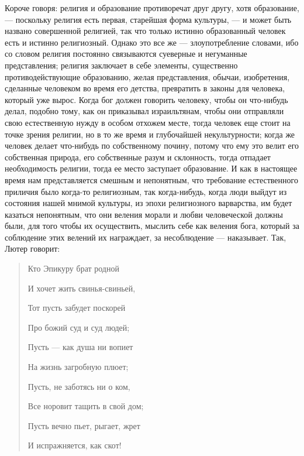 \documentclass[12pt]{article}
\begin{document}
Короче говоря: религия и образование противоречат друг другу, хотя образование, --- поскольку религия есть первая, старейшая форма культуры, --- и может быть названо совершенной религией, так что только истинно образованный человек есть и истинно религиозный. Однако это все же --- злоупотребление словами, ибо со словом религия постоянно связываются суеверные и негуманные представления; религия заключает в себе элементы, существенно противодействующие образованию, желая представления, обычаи, изобретения, сделанные человеком во время его детства, превратить в законы для человека, который уже вырос. Когда бог должен говорить человеку, чтобы он что-нибудь делал, подобно тому, как он приказывал израильтянам, чтобы они отправляли свою естественную нужду в особом отхожем месте, тогда человек еще стоит на точке зрения религии, но в то же время и глубочайшей некультурности; когда же человек делает что-нибудь по собственному почину, потому что ему это велит его собственная природа, его собственные разум и склонность, тогда отпадает необходимость религии, тогда ее место заступает образование. И как в настоящее время нам представляется смешным и непонятным, что требование естественного приличия было когда-то религиозным, так когда-нибудь, когда люди выйдут из состояния нашей мнимой культуры, из эпохи религиозного варварства, им будет казаться непонятным, что они веления морали и любви человеческой должны были, для того чтобы их осуществить, мыслить себе как веления бога, который за соблюдение этих велений их награждает, за несоблюдение --- наказывает. Так, Лютер говорит: 

\begin{quote}

Кто Эпикуру брат родной 

И хочет жить свинья-свинь\-ей, 

Тот пусть забудет поскорей 

Про божий суд и суд людей; 

Пусть --- как душа ни вопиет 

На жизнь загробную плюет; 

Пусть, не заботясь ни о ком, 

Все норовит тащить в свой дом; 

Пусть вечно пьет, рыгает, жрет 

И испражняется, как скот! 

\end{quote}
\end{document}
